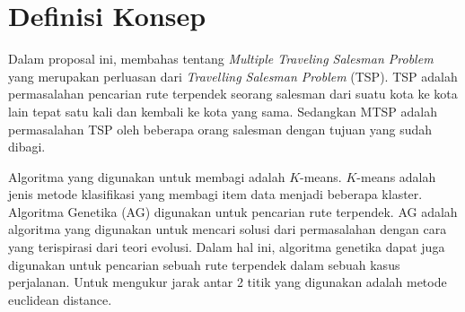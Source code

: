\section{Definisi Konsep}

Dalam proposal ini, membahas tentang \textit{Multiple Traveling Salesman Problem} yang merupakan perluasan dari \textit{Travelling Salesman Problem} (TSP). TSP adalah permasalahan pencarian rute terpendek seorang salesman dari suatu kota ke kota lain tepat satu kali dan kembali ke kota yang sama. Sedangkan MTSP adalah permasalahan TSP oleh beberapa orang salesman dengan tujuan yang sudah dibagi.

Algoritma yang digunakan untuk membagi adalah $K$-means. $K$-means adalah jenis metode klasifikasi yang membagi item data menjadi beberapa klaster. Algoritma Genetika (AG) digunakan untuk pencarian rute terpendek. AG adalah algoritma yang digunakan untuk mencari solusi dari permasalahan dengan cara yang terispirasi dari teori evolusi. Dalam hal ini, algoritma genetika dapat juga digunakan untuk pencarian sebuah rute terpendek dalam sebuah kasus perjalanan. Untuk mengukur jarak antar 2 titik yang digunakan adalah metode euclidean distance.
